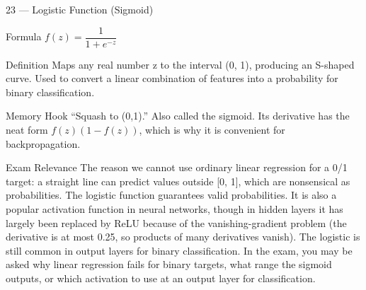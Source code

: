 \documentclass[aspectratio=169,8pt]{beamer}
\begin{document}
	\begin{frame}{23 --- Logistic Function (Sigmoid)}
		\begin{block}{Formula}
			$f(z) = \dfrac{1}{1 + e^{-z}}$
		\end{block}
		\begin{block}{Definition}
			Maps any real number z to the interval (0, 1), producing an S-shaped curve. Used to convert a linear combination of features into a probability for binary classification.
		\end{block}
		\begin{block}{Memory Hook}
			``Squash to (0,1).'' Also called the sigmoid. Its derivative has the neat form $f(z)(1 - f(z))$, which is why it is convenient for backpropagation.
		\end{block}
		\begin{block}{Exam Relevance}
			The reason we cannot use ordinary linear regression for a 0/1 target: a straight line can predict values outside [0, 1], which are nonsensical as probabilities. The logistic function guarantees valid probabilities. It is also a popular activation function in neural networks, though in hidden layers it has largely been replaced by ReLU because of the vanishing-gradient problem (the derivative is at most 0.25, so products of many derivatives vanish). The logistic is still common in output layers for binary classification. In the exam, you may be asked why linear regression fails for binary targets, what range the sigmoid outputs, or which activation to use at an output layer for classification.
		\end{block}
	\end{frame}
	
\end{document}
